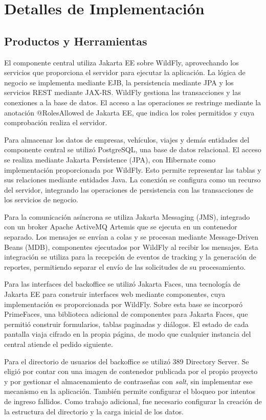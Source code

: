\section{Detalles de Implementación}

\subsection{Productos y Herramientas}
El componente central utiliza Jakarta EE sobre WildFly, aprovechando los servicios que proporciona el servidor para ejecutar la aplicación. La lógica de negocio se implementa mediante EJB, la persistencia mediante JPA y los servicios REST mediante JAX-RS. WildFly gestiona las transacciones y las conexiones a la base de datos. El acceso a las operaciones se restringe mediante la anotación @RolesAllowed de Jakarta EE, que indica los roles permitidos y cuya comprobación realiza el servidor.

Para almacenar los datos de empresas, vehículos, viajes y demás entidades del componente central se utilizó PostgreSQL, una base de datos relacional. El acceso se realiza mediante Jakarta Persistence (JPA), con Hibernate como implementación proporcionada por WildFly. Esto permite representar las tablas y sus relaciones mediante entidades Java. La conexión se configura como un recurso del servidor, integrando las operaciones de persistencia con las transacciones de los servicios de negocio.

Para la comunicación asíncrona se utiliza Jakarta Messaging (JMS), integrado con un broker Apache ActiveMQ Artemis que se ejecuta en un contenedor separado. Los mensajes se envían a colas y se procesan mediante Message-Driven Beans (MDB), componentes ejecutados por WildFly al recibir los mensajes. Esta integración se utiliza para la recepción de eventos de tracking y la generación de reportes, permitiendo separar el envío de las solicitudes de su procesamiento.

Para las interfaces del backoffice se utilizó Jakarta Faces, una tecnología de Jakarta EE para construir interfaces web mediante componentes, cuya implementación es proporcionada por WildFly. Sobre esta base se incorporó PrimeFaces, una biblioteca adicional de componentes para Jakarta Faces, que permitió construir formularios, tablas paginadas y diálogos. El estado de cada pantalla viaja cifrado en la propia página, de modo que cualquier instancia del central atiende el pedido siguiente.

Para el directorio de usuarios del backoffice se utilizó 389 Directory Server. Se eligió por contar con una imagen de contenedor publicada por el propio proyecto y por gestionar el almacenamiento de contraseñas con \textit{salt}, sin implementar ese mecanismo en la aplicación. También permite configurar el bloqueo por intentos de ingreso fallidos. Como trabajo adicional, fue necesario configurar la creación de la estructura del directorio y la carga inicial de los datos.

